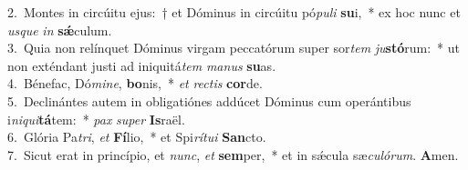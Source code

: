 {2.~}Montes in circúitu ejus:~† et Dóminus in circúitu pó\textit{pu}\textit{li} \textbf{su}i,~* ex hoc nunc et \textit{us}\textit{que} \textit{in} \textbf{sǽ}culum.\\
{3.~}Quia non relínquet Dóminus virgam peccatórum super sor\textit{tem} \textit{ju}\textbf{stó}rum:~* ut non exténdant justi ad iniquitá\textit{tem} \textit{ma}\textit{nus} \textbf{su}as.\\
{4.~}Bénefac, Dó\textit{mi}\textit{ne}, \textbf{bo}nis,~* \textit{et} \textit{re}\textit{ctis} \textbf{cor}de.\\
{5.~}Declinántes autem in obligatiónes addúcet Dóminus cum operántibus i\textit{ni}\textit{qui}\textbf{tá}tem:~* \textit{pax} \textit{su}\textit{per} \textbf{Is}raël.\\
{6.~}Glória Pa\textit{tri}, \textit{et} \textbf{Fí}lio,~* et Spi\textit{rí}\textit{tu}\textit{i} \textbf{San}cto.\\
{7.~}Sicut erat in princípio, et \textit{nunc}, \textit{et} \textbf{sem}per,~* et in sǽcula sæ\textit{cu}\textit{ló}\textit{rum}. \textbf{A}men.\\
